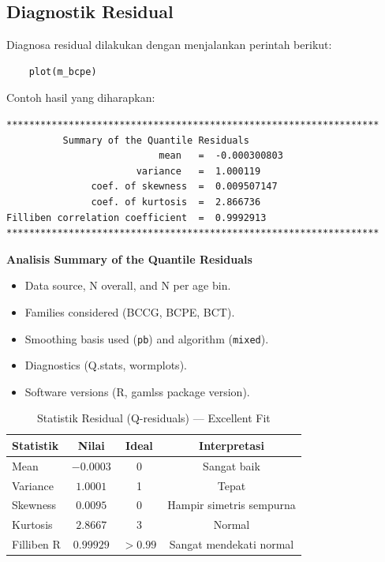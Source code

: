 \documentclass[11pt, a4paper]{article}
\begin{document}
\begin{enumerate}
\subsection{Diagnostik Residual}
Diagnosa residual dilakukan dengan menjalankan perintah berikut:
    \begin{lstlisting}
    plot(m_bcpe)
    \end{lstlisting}
Contoh hasil yang diharapkan:
\begin{Verbatim}[frame=single]
******************************************************************
	      Summary of the Quantile Residuals
                           mean   =  -0.000300803 
                       variance   =  1.000119 
               coef. of skewness  =  0.009507147 
               coef. of kurtosis  =  2.866736 
Filliben correlation coefficient  =  0.9992913 
******************************************************************
\end{Verbatim}

\textbf{Analisis Summary of the Quantile Residuals}

\begin{itemize}[label=$\square$]
    \item Data source, N overall, and N per age bin.
    \item Families considered (BCCG, BCPE, BCT).
    \item Smoothing basis used (\texttt{pb}) and algorithm (\texttt{mixed}).
    \item Diagnostics (Q.stats, wormplots).
    \item Software versions (R, gamlss package version).
\end{itemize}

\begin{table}[ht]
\centering
\caption{Statistik Residual (Q-residuals) — Excellent Fit}
\label{tab:residual_stats}
\begin{tabular}{lccc}
\toprule
\textbf{Statistik} & \textbf{Nilai} & \textbf{Ideal} & \textbf{Interpretasi} \\
\midrule
Mean          & $-0.0003$ & 0 & Sangat baik \\
Variance      & $1.0001$  & 1 & Tepat \\
Skewness      & $0.0095$  & 0 & Hampir simetris sempurna \\
Kurtosis      & $2.8667$  & 3 & Normal \\
Filliben R    & $0.99929$ & $>0.99$ & Sangat mendekati normal \\
\bottomrule
\end{tabular}
\end{table}


\end{enumerate}
\end{document}
